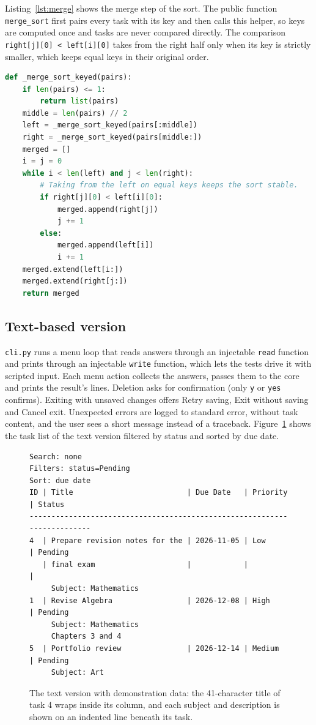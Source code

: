\documentclass[11pt,a4paper]{article}
\newcommand{\code}[1]{\texttt{#1}}
\begin{document}
Listing~\ref{lst:merge} shows the merge step of the sort. The public
function \code{merge\_sort} first pairs every task with its key and then
calls this helper, so keys are computed once and tasks are never compared
directly. The comparison \code{right[j][0] < left[i][0]} takes from the
right half only when its key is strictly smaller, which keeps equal keys in
their original order.

\begin{lstlisting}[language=Python, caption={The recursive merge sort in
\code{core.py}, applied to (key, task) pairs.}, label={lst:merge}]
def _merge_sort_keyed(pairs):
    if len(pairs) <= 1:
        return list(pairs)
    middle = len(pairs) // 2
    left = _merge_sort_keyed(pairs[:middle])
    right = _merge_sort_keyed(pairs[middle:])
    merged = []
    i = j = 0
    while i < len(left) and j < len(right):
        # Taking from the left on equal keys keeps the sort stable.
        if right[j][0] < left[i][0]:
            merged.append(right[j])
            j += 1
        else:
            merged.append(left[i])
            i += 1
    merged.extend(left[i:])
    merged.extend(right[j:])
    return merged
\end{lstlisting}

\subsection{Text-based version}
\code{cli.py} runs a menu loop that reads answers through an injectable
\code{read} function and prints through an injectable \code{write} function,
which lets the tests drive it with scripted input. Each menu action collects
the answers, passes them to the core and prints the result's lines. Deletion
asks for confirmation (only \code{y} or \code{yes} confirms). Exiting with
unsaved changes offers Retry saving, Exit without saving and Cancel exit.
Unexpected errors are logged to standard error, without task content, and the
user sees a short message instead of a traceback. Figure~\ref{fig:cli} shows
the task list of the text version filtered by status and sorted by due date.

\begin{figure}[ht]
\centering
\begin{lstlisting}[numbers=none, basicstyle=\ttfamily\footnotesize]
Search: none
Filters: status=Pending
Sort: due date
ID | Title                          | Due Date   | Priority | Status
-------------------------------------------------------------------------
4  | Prepare revision notes for the | 2026-11-05 | Low      | Pending
   | final exam                     |            |          |
     Subject: Mathematics
1  | Revise Algebra                 | 2026-12-08 | High     | Pending
     Subject: Mathematics
     Chapters 3 and 4
5  | Portfolio review               | 2026-12-14 | Medium   | Pending
     Subject: Art
\end{lstlisting}
\caption{The text version with demonstration data: the 41-character title
of task 4 wraps inside its column, and each subject and description is
shown on an indented line beneath its task.}
\label{fig:cli}
\end{figure}
\end{document}
